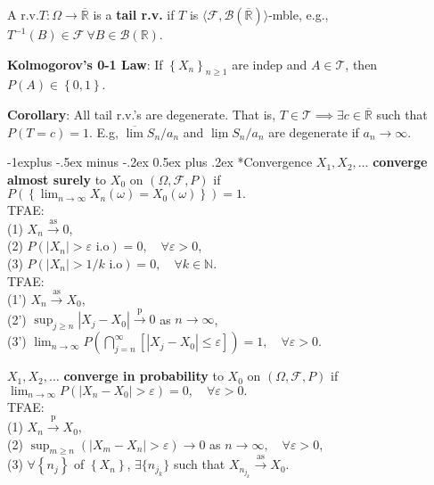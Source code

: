 \documentclass[paper=letter,fontsize=2.89mm]{scrartcl}
\makeatletter
\newcommand{\convprob}{\stackrel{\text{p}}{\longrightarrow}}
\newcommand{\convas}{\stackrel{\text{as}}{\longrightarrow}}
\newcommand{\Borel}{\mathcal{B}}
\newcommand{\eps}{\varepsilon}
\newcommand{\R}{\mathbb{R}}
\newcommand{\N}{\mathbb{N}}
\newcommand\abs[1]{\left| #1 \right|}
\newcommand\set[1]{\left\{ #1 \right\}}
\renewcommand{\subsection}{\@startsection{subsection}{2}{0mm}%
                                {-1explus -.5ex minus -.2ex}%
                                {0.5ex plus .2ex}%
                                {\normalfont\normalsize\bfseries}}
\makeatother
\begin{document}
\begin{multicols*}{3}
A r.v.\@ $T: \Omega \to \overline{\R}$ is a \textbf{tail r.v.\@} if $T$ is $\langle \mathcal{F}, \Borel(\overline{\R})\rangle$-mble, e.g., $T^{-1}(B) \in \mathcal{F} ~\forall B \in \Borel(\R)$. \\ \medskip

\textbf{Kolmogorov's 0-1 Law}: If $\set{X_n}_{n\ge1}$ are indep and $A \in \mathcal{T}$, then $P(A) \in \set{0,1}$. \\\medskip

\textbf{Corollary}: All tail r.v.'s are degenerate. That is, $T \in \mathcal{T} \implies \exists c \in \overline{\R}$ such that $P(T = c) = 1$. E.g, $\overline{\lim} S_n/a_n$ and $\underline{\lim}S_n/a_n$ are degenerate if $a_n \to \infty$. \\ \medskip

\subsection*{Convergence}
$X_1, X_2, \dots$ \textbf{converge almost surely} to $X_0$ on $(\Omega, \mathcal{F}, P)$ if
$P\left(\set{\lim_{n\to\infty} X_n(\omega) = X_0(\omega)}\right) = 1.$ \\ 
TFAE: \\
(1) $X_n \convas 0$, \\
(2) $P(\abs{X_n} > \eps \text{ i.o}) = 0, \quad \forall \eps > 0$, \\
(3) $P(\abs{X_n} > 1/k \text{ i.o}) = 0, \quad \forall k \in \N$. \\
TFAE: \\
(1') $X_n \convas X_0$, \\
(2') $\sup_{j\ge n} \abs{X_j - X_0} \convprob 0$ as $n\to\infty$, \\
(3') $\lim_{n\to\infty} P\left(\bigcap_{j=n}^\infty \left[ \abs{X_j - X_0} \le \eps\right]\right) = 1, \quad \forall \eps > 0$.  \\ \medskip

$X_1, X_2, \dots$ \textbf{converge in probability} to $X_0$ on $(\Omega, \mathcal{F}, P)$ if
$\lim_{n\to\infty} P\left(\abs{X_n - X_0} > \eps\right) = 0, \quad \forall \eps > 0.$ \\ 
TFAE: \\
(1) $X_n \convprob X_0$, \\
(2) $\sup_{m\ge n}\left( \abs{X_m - X_n} > \eps\right) \to 0$ as $n\to\infty, \quad \forall \eps > 0$, \\
(3) $\forall \set{n_j}$ of $\set{X_n}$,  $\exists \{n_{j_k}\}$ such that $X_{n_{j_k}} \convas X_0$. \\ \medskip


\end{multicols*}
\end{document}
